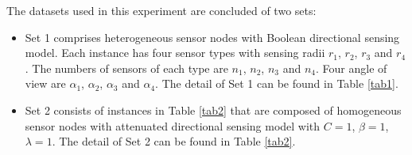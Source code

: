 \documentclass[final]{elsarticle}
\begin{document}
The datasets used in this experiment are concluded of two sets: 
\begin{itemize}
	\item Set 1 comprises heterogeneous sensor nodes with Boolean directional sensing model. Each instance has four sensor types with sensing radii $ r_1 $, $ r_2 $, $ r_3 $ and $ r_4 $. The numbers of sensors of each type are $ n_1 $, $ n_2 $, $ n_3 $ and $ n_4 $. Four angle of view are $ \alpha_1 $, $ \alpha_2 $, $ \alpha_3 $ and $ \alpha_4 $. The detail of Set 1 can be found in Table \ref{tab1}.
	\item Set 2 consists of instances in Table \ref{tab2} that are composed of homogeneous sensor nodes with attenuated directional sensing model with $C=1$, $\beta =1$, $\lambda =1$. The detail of Set 2 can be found in Table \ref{tab2}.
\end{itemize}
\begin{table}
	\caption{Experiment Instance for heterogeneous- Dataset 1}
	\label{tab1}       %
	\begin{center}
		\renewcommand{\arraystretch}{1.3}
	\end{center}
\end{table}
\end{document}

